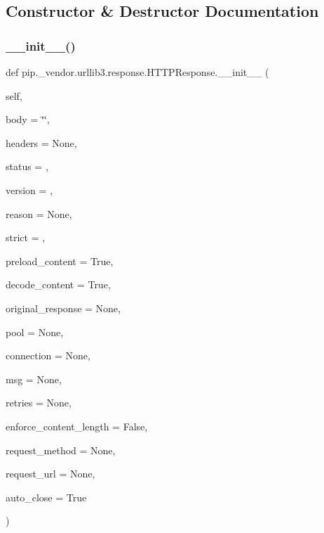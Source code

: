 \subsection{Constructor \& Destructor Documentation}
\mbox{\label{classpip_1_1__vendor_1_1urllib3_1_1response_1_1HTTPResponse_a15818d4ff92c8cb5263ed82d41590a5b}} 
\subsubsection{\texorpdfstring{\+\_\+\+\_\+init\+\_\+\+\_\+()}{\_\_init\_\_()}}
{\footnotesize\ttfamily def pip.\+\_\+vendor.\+urllib3.\+response.\+H\+T\+T\+P\+Response.\+\_\+\+\_\+init\+\_\+\+\_\+ (\begin{DoxyParamCaption}\item[{}]{self,  }\item[{}]{body = {\ttfamily \char`\"{}\char`\"{}},  }\item[{}]{headers = {\ttfamily None},  }\item[{}]{status = {},  }\item[{}]{version = {},  }\item[{}]{reason = {\ttfamily None},  }\item[{}]{strict = {},  }\item[{}]{preload\+\_\+content = {\ttfamily True},  }\item[{}]{decode\+\_\+content = {\ttfamily True},  }\item[{}]{original\+\_\+response = {\ttfamily None},  }\item[{}]{pool = {\ttfamily None},  }\item[{}]{connection = {\ttfamily None},  }\item[{}]{msg = {\ttfamily None},  }\item[{}]{retries = {\ttfamily None},  }\item[{}]{enforce\+\_\+content\+\_\+length = {\ttfamily False},  }\item[{}]{request\+\_\+method = {\ttfamily None},  }\item[{}]{request\+\_\+url = {\ttfamily None},  }\item[{}]{auto\+\_\+close = {\ttfamily True} }\end{DoxyParamCaption})}



